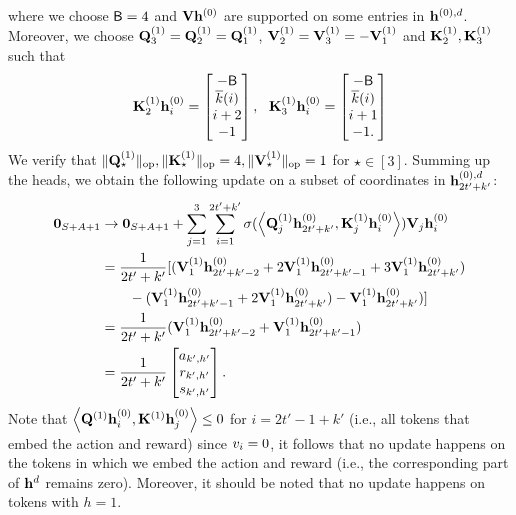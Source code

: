 where we choose ${\mathsf{B}}=4$ and ${\mathbf V}{\mathbf h}^{(0)}$ are supported on some entries in ${\mathbf h}^{(0),{d}}$. Moreover, we choose ${\mathbf Q}^{(1)}_{3}={\mathbf Q}^{(1)}_{2}={\mathbf Q}^{(1)}_1$, ${\mathbf V}^{(1)}_2={\mathbf V}^{(1)}_3=-{\mathbf V}^{(1)}_1$ and ${\mathbf K}^{(1)}_2,{\mathbf K}^{(1)}_3$ such that
\begin{align*}
    {\mathbf K}^{(1)}_{2}{\mathbf h}^{(0)}_{i}=\begin{bmatrix}
        -{\mathsf{B}}\\\overline{k}(i)\\ i+2\\-1
\end{bmatrix},~~{\mathbf K}^{(1)}_{3}{\mathbf h}^{(0)}_{i}=\begin{bmatrix}
        -{\mathsf{B}}\\\overline{k}(i)\\ i+1\\-1.
\end{bmatrix}
\end{align*}
We verify that $\|{{\mathbf Q}^{(1)}_{\star}}\|_{\mathrm{op}},\|{{\mathbf K}^{(1)}_{\star}}\|_{\mathrm{op}}= 4,\|{{\mathbf V}^{(1)}_{\star}}\|_{\mathrm{op}}=1$ for $\star\in[3]$. 
Summing up the  heads, we obtain the following update on a subset of coordinates in ${\mathbf h}^{(0),{d}}_{2t'+k'}$:
\begin{align*}
{\mathbf 0}_{{S}+{A}+1}
    &\rightarrow 
{\mathbf 0}_{{S}+{A}+1}+\sum_{j=1}^3\sum_{i=1}^{2t'+k'}\sigma(\left\langle{\mathbf Q}^{(1)}_{j}{\mathbf h}^{(0)}_{2t'+k'},{\mathbf K}^{(1)}_{j}{\mathbf h}^{(0)}_{i}\right\rangle){\mathbf V}_j{\mathbf h}^{(0)}_i\\
    &=\frac{1}{2t'+k'} [({\mathbf V}^{(1)}_1{\mathbf h}^{(0)}_{2t'+k'-2}+2{\mathbf V}^{(1)}_1{\mathbf h}^{(0)}_{2t'+k'-1}+3{\mathbf V}^{(1)}_1{\mathbf h}^{(0)}_{2t'+k'})\\
    &\qquad-({\mathbf V}^{(1)}_1{\mathbf h}^{(0)}_{2t'+k'-1}+2{\mathbf V}^{(1)}_1{\mathbf h}^{(0)}_{2t'+k'})-{\mathbf V}^{(1)}_1{\mathbf h}^{(0)}_{2t'+k'})]\\
    &=\frac{1}{2t'+k'}({\mathbf V}^{(1)}_1{\mathbf h}^{(0)}_{2t'+k'-2}+{\mathbf V}^{(1)}_1{\mathbf h}^{(0)}_{2t'+k'-1})\\
    &=\frac{1}{2t'+k'}\begin{bmatrix}
        {a}_{k',h'} \\{r}_{k',h'}\\{s}_{k',h'}
    \end{bmatrix}.
\end{align*}
Note that $\left\langle{\mathbf Q}^{(1)}{\mathbf h}^{(0)}_i,{\mathbf K}^{(1)}{\mathbf h}^{(0)}_j\right\rangle\leq0$ for $i=2t'-1+k'$ (i.e., all tokens that embed the action and reward) since ${v}_i=0$, it follows that no update happens on the tokens in which we embed the action and reward (i.e., the corresponding part of ${\mathbf h}^{d}$ remains zero). Moreover, it should be noted that no  update happens on tokens with $h=1$. 

